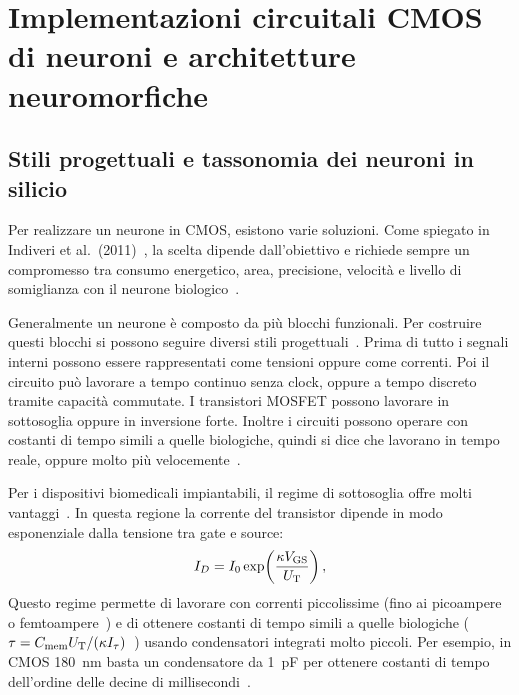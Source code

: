 \section[Implementazioni circuitali CMOS]{Implementazioni circuitali CMOS di neuroni e architetture neuromorfiche}
\label{sec:cmos}

\subsection{Stili progettuali e tassonomia dei neuroni in silicio}
\label{subsec:tassonomia_cmos}

Per realizzare un neurone in CMOS, esistono varie soluzioni. Come spiegato in Indiveri et al.\ (2011)~\cite{indiveri2011}, la scelta dipende dall'obiettivo e richiede sempre un compromesso tra consumo energetico, area, precisione, velocità e livello di somiglianza con il neurone biologico~\cite{indiveri2011}.

Generalmente un neurone è composto da più blocchi funzionali. Per costruire questi blocchi si possono seguire diversi stili progettuali~\cite{indiveri2011}. Prima di tutto i segnali interni possono essere rappresentati come tensioni oppure come correnti. Poi il circuito può lavorare a tempo continuo senza clock, oppure a tempo discreto tramite capacità commutate. I transistori MOSFET possono lavorare in sottosoglia oppure in inversione forte. Inoltre i circuiti possono operare con costanti di tempo simili a quelle biologiche, quindi si dice che lavorano in tempo reale, oppure molto più velocemente~\cite{indiveri2011}.

Per i dispositivi biomedicali impiantabili, il regime di sottosoglia offre molti vantaggi~\cite{indiveri2011}. In questa regione la corrente del transistor dipende in modo esponenziale dalla tensione tra gate e source:
\begin{equation}
  I_D = I_0 \exp\!\left(\frac{\kappa V_{\mathrm{GS}}}{U_{\mathrm{T}}}\right),
  \label{eq:subthreshold}
\end{equation}
Questo regime permette di lavorare con correnti piccolissime (fino ai picoampere o femtoampere~\cite{indiveri2011}) e di ottenere costanti di tempo simili a quelle biologiche ($\tau = C_{\mathrm{mem}} U_{\mathrm{T}} / (\kappa I_\tau)$~\cite{bartels2025}) usando condensatori integrati molto piccoli. Per esempio, in CMOS \SI{180}{\nano\meter} basta un condensatore da \SI{1}{\pico\farad} per ottenere costanti di tempo dell'ordine delle decine di millisecondi~\cite{indiveri2011, qiao2015}.

